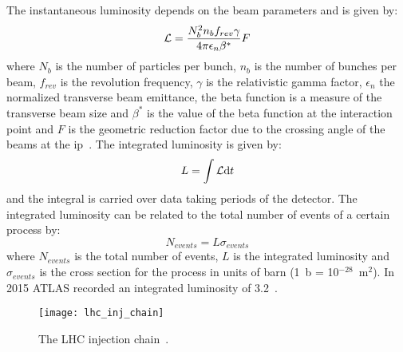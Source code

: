 The instantaneous luminosity depends on the beam parameters and is given by:
\begin{equation}
  \label{eq:70}
  \mathcal{L} = \frac{N^2_b n_b f_{rev} \gamma}{4 \pi \epsilon_n \beta^*} F
\end{equation}
where $N_b$ is the number of particles per bunch, $n_b$ is the number of bunches
per beam, $f_{rev}$ is the revolution frequency, $\gamma$ is the relativistic
gamma factor, $\epsilon_n$ the normalized transverse beam emittance, the beta
function is a measure of the transverse beam size and $\beta^*$ is the value of
the beta function at the interaction point and $F$ is the geometric reduction
factor due to the crossing angle of the beams at the \gls{ip}~\cite{LHC}. The
integrated luminosity is given by:
\begin{equation}
  \label{eq:71}
  L = \int \mathcal{L} \mathrm{d} t
\end{equation}
and the integral is carried over data taking periods of the detector. The
integrated luminosity can be related to the total number of events of a certain
process by:
\begin{equation}
  \label{eq:72}
  N_{events} = L \sigma_{events}
\end{equation}
where $N_{events}$ is the total number of events, $L$ is the integrated
luminosity and $\sigma_{events}$ is the cross section for the process in units
of barn (1~b = 10$^{-28}$~m$^2$). In 2015 ATLAS recorded an integrated
luminosity of 3.2~\ifb.

\begin{figure}[!h]
  \centering
    \texttt{[image: lhc\_inj\_chain]}
    \caption{The LHC injection chain~\cite{LHCFAQ}.}
    \label{fig:lhc_inj_chain}
\end{figure}
